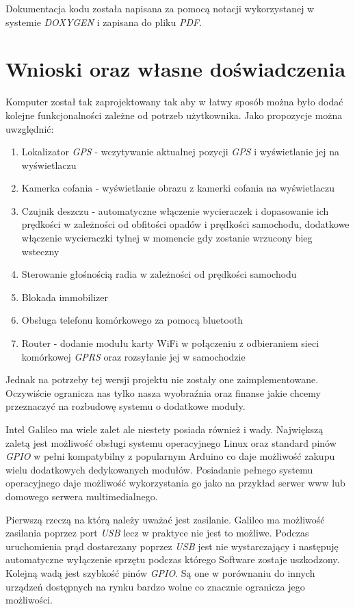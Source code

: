 \documentclass{xmgr}
\begin{document}
Dokumentacja kodu została napisana za pomocą notacji wykorzystanej w systemie \emph{DOXYGEN} i zapisana do pliku \emph{PDF}.

\section{Wnioski oraz własne doświadczenia}
Komputer został tak zaprojektowany tak aby w łatwy sposób można było dodać kolejne funkcjonalności zależne od potrzeb użytkownika. Jako propozycje można uwzględnić:
\begin{enumerate}
	\item Lokalizator \emph{GPS} - wczytywanie aktualnej pozycji \emph{GPS} i wyświetlanie jej na wyświetlaczu
	\item Kamerka cofania - wyświetlanie obrazu z kamerki cofania na wyświetlaczu
	\item Czujnik deszczu - automatyczne włączenie wycieraczek i dopasowanie ich prędkości w zależności od obfitości opadów i prędkości samochodu, dodatkowe włączenie wycieraczki tylnej w momencie gdy zostanie wrzucony bieg wsteczny
	\item Sterowanie głośnością radia w zależności od prędkości samochodu
	\item Blokada immobilizer
	\item Obsługa telefonu komórkowego za pomocą bluetooth
	\item Router - dodanie modułu karty WiFi w połączeniu z odbieraniem sieci komórkowej \emph{GPRS} oraz rozsyłanie jej w samochodzie
\end{enumerate}
Jednak na potrzeby tej wersji projektu nie zostały one zaimplementowane. Oczywiście ogranicza nas tylko nasza wyobraźnia oraz finanse jakie chcemy przeznaczyć na rozbudowę systemu o dodatkowe moduły.

Intel Galileo ma wiele zalet ale niestety posiada również i wady. Największą zaletą jest możliwość obsługi systemu operacyjnego Linux oraz standard pinów \emph{GPIO} w pełni kompatybilny z popularnym Arduino co daje możliwość zakupu wielu dodatkowych dedykowanych modułów. Posiadanie pełnego systemu operacyjnego daje możliwość wykorzystania go jako na przykład serwer www lub domowego serwera multimedialnego. 

Pierwszą rzeczą na którą należy uważać jest zasilanie. Galileo ma możliwość zasilania poprzez port \emph{USB} lecz w praktyce nie jest to możliwe. Podczas uruchomienia prąd dostarczany poprzez \emph{USB} jest nie wystarczający i następuję automatyczne wyłączenie sprzętu podczas którego Software zostaje uszkodzony. Kolejną wadą jest szybkość pinów \emph{GPIO}. Są one w porównaniu do innych urządzeń dostępnych na rynku bardzo wolne co znacznie ogranicza jego możliwości.
\end{document}
